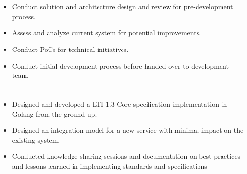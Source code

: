 \documentclass[12pt]{res} %
\begin{document}
\begin{resume}
\begin{multicols}{2}
	\section{}
		\begin{itemize}
			\item Conduct solution and architecture design and review for pre-development process.
			\item Assess and analyze current system for potential improvements.
			\item Conduct PoCs for technical initiatives.
			\item Conduct initial development process before handed over to development team.
		\end{itemize}
	\section{}
		\begin{itemize}
			\item Designed and developed a LTI 1.3 Core specification implementation in Golang from the ground up.
			\item Designed an integration model for a new service with minimal impact on the existing system.
			\item Conducted knowledge sharing sessions and documentation on best practices and lessons learned in implementing standards and specifications
		\end{itemize}
\end{multicols}


\end{resume}
\end{document}
